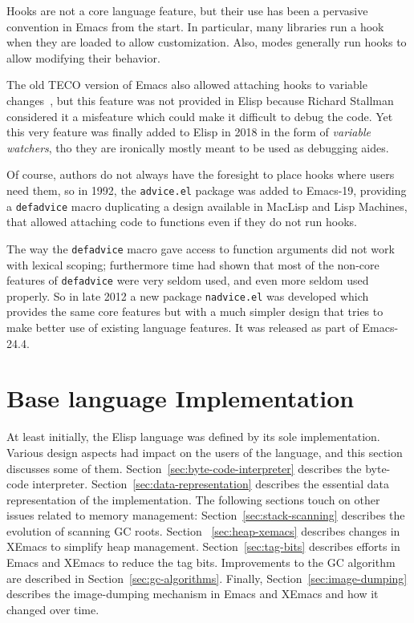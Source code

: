 \documentclass[format=acmsmall, review=false, screen=true]{acmart}
\newcommand \Elisp {Elisp}
\begin{document}
Hooks are not a core language feature, but their use has been a
pervasive convention in Emacs from the start.  In particular, many
libraries run a hook when they are loaded to allow customization.
Also, modes generally run hooks to allow modifying their behavior.

The old TECO version of Emacs also allowed attaching hooks to variable
changes~\cite{Stallman1981}, but this feature was not provided in \Elisp{}
because Richard Stallman considered it a misfeature which could make it
difficult to debug the code.  Yet this very feature was finally added to
\Elisp{} in 2018 in the form of \emph{variable watchers}, tho they are
ironically mostly meant to be used as debugging aides.

Of course, authors do not always have the foresight to place hooks where
users need them, so in 1992, the \texttt{advice.el} package was added to
Emacs-19, providing a \texttt{defadvice} macro duplicating a design
available in MacLisp and Lisp Machines, that allowed attaching code to
functions even if they do not run hooks.

The way the \texttt{defadvice} macro gave access to function arguments did
not work with lexical scoping; furthermore time had shown that most of the
non-core features of \texttt{defadvice} were very seldom used, and even more
seldom used properly.  So in late 2012 a new package \texttt{nadvice.el} was
developed which provides the same core features but with a much simpler
design that tries to make better use of existing language features.  It was
released as part of Emacs-24.4.

\section{Base language Implementation}
\label{sec:base-language-implementation}

At least initially, the \Elisp{} language was defined by its sole
implementation.  Various design aspects had impact on the users of the
language, and this section discusses some of them.
Section~\ref{sec:byte-code-interpreter} describes the byte-code
interpreter.  Section~\ref{sec:data-representation} describes the
essential data representation of the implementation.  The following
sections touch on other issues related to memory management:
Section~\ref{sec:stack-scanning} describes the evolution of scanning
GC roots. Section ~\ref{sec:heap-xemacs} describes changes in XEmacs
to simplify heap management.  Section~\ref{sec:tag-bits} describes
efforts in Emacs and XEmacs to reduce the tag bits.  Improvements to
the GC algorithm are described in Section~\ref{sec:gc-algorithms}.
Finally, Section~\ref{sec:image-dumping} describes the
image-dumping mechanism in Emacs and XEmacs and how it changed over time.
\end{document}
